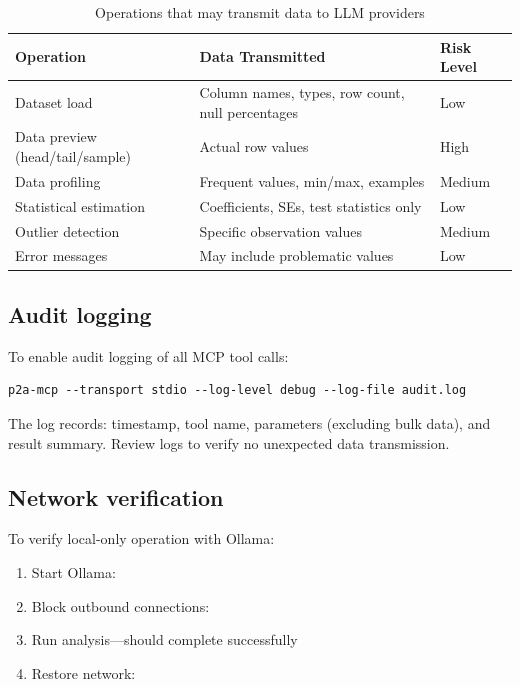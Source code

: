 \begin{table}[htbp]
\centering
\caption{Operations that may transmit data to LLM providers}
\label{tab:data-transmission}
\small
\begin{tabular}{lp{6cm}l}
\toprule
Operation & Data Transmitted & Risk Level \\
\midrule
Dataset load & Column names, types, row count, null percentages & Low \\
Data preview (head/tail/sample) & Actual row values & High \\
Data profiling & Frequent values, min/max, examples & Medium \\
Statistical estimation & Coefficients, SEs, test statistics only & Low \\
Outlier detection & Specific observation values & Medium \\
Error messages & May include problematic values & Low \\
\bottomrule
\end{tabular}
\end{table}

\subsection{Audit logging}

To enable audit logging of all MCP tool calls:

\begin{verbatim}
p2a-mcp --transport stdio --log-level debug --log-file audit.log
\end{verbatim}

\noindent The log records: timestamp, tool name, parameters (excluding bulk
data), and result summary. Review logs to verify no unexpected data transmission.

\subsection{Network verification}

To verify local-only operation with Ollama:

\begin{enumerate}
  \item Start Ollama: 
  \item Block outbound connections: 
  \item Run analysis---should complete successfully
  \item Restore network: 
\end{enumerate}

